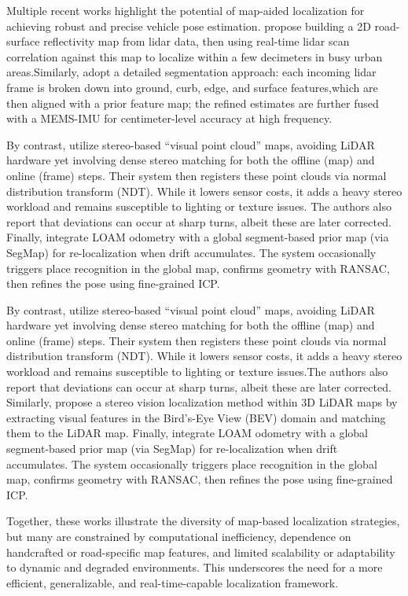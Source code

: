 Multiple recent works highlight the potential of map-aided localization for achieving robust and precise vehicle pose estimation.\cite{Levinson2007MapBased} propose building a 2D road-surface reflectivity map from lidar data, then using real-time lidar scan correlation against this map to localize within a few decimeters in busy urban areas.Similarly,\cite{liu2019segmentation} adopt a detailed segmentation approach: each incoming lidar frame is broken down into ground, curb, edge, and surface features,which are then aligned with a prior feature map; the refined estimates are further fused with a MEMS-IMU for centimeter-level accuracy at high frequency.

By contrast,\cite{Lin2021Autonomous} utilize stereo-based “visual point cloud” maps, avoiding LiDAR hardware yet involving dense stereo matching for both the offline (map) and online (frame) steps. Their system then registers these point clouds via normal distribution transform (NDT). While it lowers sensor costs, it adds a heavy stereo workload and remains susceptible to lighting or texture issues. The authors also report that deviations can occur at sharp turns, albeit these are later corrected. Finally, \cite{Rozenberszki2020LOL} integrate LOAM odometry with a global segment-based prior map (via SegMap) for re-localization when drift accumulates. The system occasionally triggers place recognition in the global map, confirms geometry with RANSAC, then refines the pose using fine-grained ICP.

By contrast, \cite{Lin2021Autonomous} utilize stereo-based “visual point cloud” maps, avoiding LiDAR hardware yet involving dense stereo matching for both the offline (map) and online (frame) steps. Their system then registers these point clouds via normal distribution transform (NDT). While it lowers sensor costs, it adds a heavy stereo workload and remains susceptible to lighting or texture issues.The authors also report that deviations can occur at sharp turns, albeit these are later corrected. Similarly, \cite{kim2018stereo} propose a stereo vision localization method within 3D LiDAR maps by extracting visual features in the Bird’s-Eye View (BEV) domain and matching them to the LiDAR map. Finally, \cite{Rozenberszki2020LOL} integrate LOAM odometry with a global segment-based prior map (via SegMap) for re-localization when drift accumulates. The system occasionally triggers place recognition in the global map, confirms geometry with RANSAC, then refines the pose using fine-grained ICP.


Together, these works illustrate the diversity of map-based localization strategies, but many are constrained by computational inefficiency, dependence on handcrafted or road-specific map features, and limited scalability or adaptability to dynamic and degraded environments. This underscores the need for a more efficient, generalizable, and real-time-capable localization framework.


